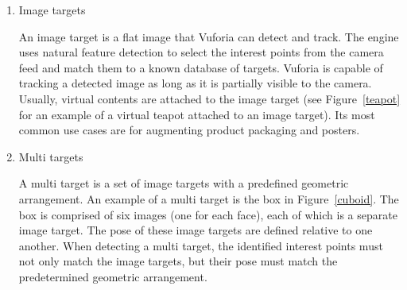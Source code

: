 \begin{enumerate}
\item Image targets

An image target is a flat image that Vuforia can detect and track. The engine uses natural feature detection to select the interest points from the camera feed and match them to a known database of targets. Vuforia is capable of tracking a detected image as long as it is partially visible to the camera. Usually, virtual contents are attached to the image target (see Figure~\ref{teapot} for an example of a virtual teapot attached to an image target). Its most common use cases are for augmenting product packaging and posters.

\begin{figure}[!ht]
\end{figure}

\begin{figure}[!ht]
\end{figure}

\item Multi targets

A multi target is a set of image targets with a predefined geometric arrangement. An example of a multi target is the box in Figure~\ref{cuboid}. The box is comprised of six images (one for each face), each of which is a separate image target. The pose of these image targets are defined relative to one another. When detecting a multi target, the identified interest points must not only match the image targets, but their pose must match the predetermined geometric arrangement.


\end{enumerate}
